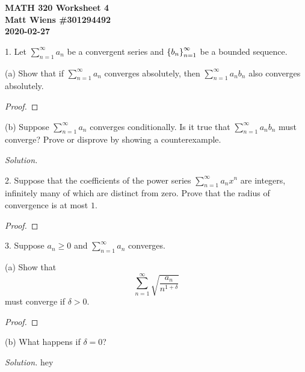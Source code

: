 \documentclass{article}
\begin{document}
\textbf{MATH 320 Worksheet 4} \\
\textbf{Matt Wiens \#301294492} \\
\textbf{2020-02-27}

1. Let $\sum_{n = 1}^\infty a_n$ be a convergent series and
   $\cbr{b_n}_{n = 1}^\infty$ be a bounded sequence.

(a) Show that if $\sum_{n = 1}^\infty a_n$ converges absolutely, then
$\sum_{n = 1}^\infty a_n b_n$ also converges absolutely.

\begin{proof}

\end{proof}

(b) Suppose $\sum_{n = 1}^\infty a_n$ converges conditionally. Is it
true that $\sum_{n = 1}^\infty a_n b_n$ must converge? Prove or disprove
by showing a counterexample.

\textit{Solution.}

\newpage

2. Suppose that the coefficients of the power series $\sum_{n =
   1}^\infty a_n x^n$ are integers, infinitely many of which are
   distinct from zero. Prove that the radius of convergence is at most
   $1$.

\begin{proof}

\end{proof}

\newpage

3. Suppose $a_n \geq 0$ and $\sum_{n = 1}^\infty a_n$ converges.

(a) Show that
%
\begin{equation*}
    \sum_{n = 1}^\infty \sqrt{\frac{a_n}{n^{1 + \delta}}}
\end{equation*}
%
must converge if $\delta > 0$.

\begin{proof}

\end{proof}

(b) What happens if $\delta = 0$?

\textit{Solution.}
hey
\end{document}
